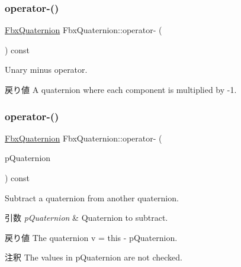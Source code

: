 \subsubsection{\texorpdfstring{operator-\/()}{operator-()}\hspace{0.1cm}{\footnotesize\ttfamily [2/3]}}
{\footnotesize\ttfamily \hyperlink{class_fbx_quaternion}{Fbx\+Quaternion} Fbx\+Quaternion\+::operator-\/ (\begin{DoxyParamCaption}{ }\end{DoxyParamCaption}) const}

Unary minus operator. \begin{DoxyReturn}{戻り値}
A quaternion where each component is multiplied by -\/1. 
\end{DoxyReturn}
\mbox{\label{class_fbx_quaternion_abd969b5c185fc64c2784ed938436294f}} 
\subsubsection{\texorpdfstring{operator-\/()}{operator-()}\hspace{0.1cm}{\footnotesize\ttfamily [3/3]}}
{\footnotesize\ttfamily \hyperlink{class_fbx_quaternion}{Fbx\+Quaternion} Fbx\+Quaternion\+::operator-\/ (\begin{DoxyParamCaption}\item[{const \hyperlink{class_fbx_quaternion}{Fbx\+Quaternion} \&}]{p\+Quaternion }\end{DoxyParamCaption}) const}

Subtract a quaternion from another quaternion. 
\begin{DoxyParams}{引数}
{\em p\+Quaternion} & Quaternion to subtract. \\
\hline
\end{DoxyParams}
\begin{DoxyReturn}{戻り値}
The quaternion v\textquotesingle{} = this -\/ p\+Quaternion. 
\end{DoxyReturn}
\begin{DoxyRemark}{注釈}
The values in p\+Quaternion are not checked. 
\end{DoxyRemark}
\mbox{\label{class_fbx_quaternion_a1982e4d640a3cf4b9bc4987e7a683a58}} 
